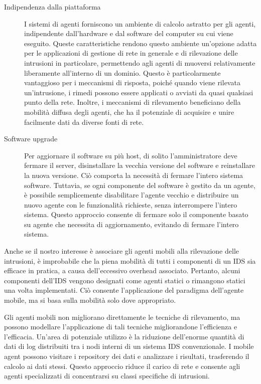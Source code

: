 \begin{description}
    \item [Indipendenza dalla piattaforma]  I sistemi di agenti forniscono un ambiente di calcolo astratto per gli agenti, indipendente dall'hardware e dal software del computer su cui viene eseguito. Queste caratteristiche rendono questo ambiente un'opzione adatta per le applicazioni di gestione di rete in generale e di rilevazione delle intrusioni in particolare, permettendo agli agenti di muoversi relativamente liberamente all'interno di un dominio. Questo è particolarmente vantaggioso per i meccanismi di risposta, poiché quando viene rilevata un'intrusione, i rimedi possono essere applicati o avviati da quasi qualsiasi punto della rete. Inoltre, i meccanismi di rilevamento beneficiano della mobilità diffusa degli agenti, che ha il potenziale di acquisire e unire facilmente dati da diverse fonti di rete.
    \item [Software upgrade] Per aggiornare il software su più host, di solito l'amministratore deve fermare il server, disinstallare la vecchia versione del software e reinstallare la nuova versione. Ciò comporta la necessità di fermare l'intero sistema software. Tuttavia, se ogni componente del software è gestito da un agente, è possibile semplicemente disabilitare l'agente vecchio e distribuire un nuovo agente con le funzionalità richieste, senza interrompere l'intero sistema. Questo approccio consente di fermare solo il componente basato su agente che necessita di aggiornamento, evitando di fermare l'intero sistema.
\end{description}


Anche se il nostro interesse è associare gli  agenti mobili alla rilevazione delle intrusioni, è improbabile che la piena mobilità di tutti i componenti di un IDS sia  efficace in pratica, a causa dell'eccessivo overhead associato. Pertanto, alcuni componenti dell'IDS vengono designati come agenti statici o rimangono statici una volta implementati. Ciò consente l'applicazione del paradigma dell'agente mobile, ma si basa sulla mobilità solo dove appropriato.

\smallskip

Gli agenti mobili non migliorano direttamente le tecniche di rilevamento, ma possono modellare l'applicazione di tali tecniche migliorandone l'efficienza e l'efficacia. Un'area di potenziale utilizzo è la riduzione dell'enorme quantità di dati di log distribuiti tra i nodi interni di un sistema IDS convenzionale. I mobile agent possono visitare i repository dei dati e analizzare i risultati, trasferendo il calcolo ai dati stessi. Questo approccio riduce il carico di rete e consente agli agenti specializzati di concentrarsi su classi specifiche di intrusioni.

